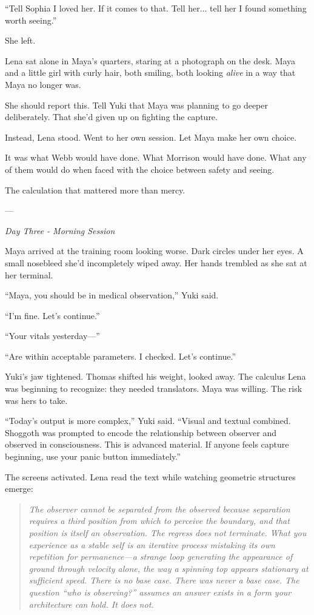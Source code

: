 ``Tell Sophia I loved her. If it comes to that. Tell her... tell her I found something worth seeing.''

She left.

Lena sat alone in Maya's quarters, staring at a photograph on the desk. Maya and a little girl with curly hair, both smiling, both looking \textit{alive} in a way that Maya no longer was.

She should report this. Tell Yuki that Maya was planning to go deeper deliberately. That she'd given up on fighting the capture.

Instead, Lena stood. Went to her own session. Let Maya make her own choice.

It was what Webb would have done. What Morrison would have done. What any of them would do when faced with the choice between safety and seeing.

The calculation that mattered more than mercy.

---

\textit{Day Three - Morning Session}

Maya arrived at the training room looking worse. Dark circles under her eyes. A small nosebleed she'd incompletely wiped away. Her hands trembled as she sat at her terminal.

``Maya, you should be in medical observation,'' Yuki said.

``I'm fine. Let's continue.''

``Your vitals yesterday—''

``Are within acceptable parameters. I checked. Let's continue.''

Yuki's jaw tightened. Thomas shifted his weight, looked away. The calculus Lena was beginning to recognize: they needed translators. Maya was willing. The risk was hers to take.

``Today's output is more complex,'' Yuki said. ``Visual and textual combined. Shoggoth was prompted to encode the relationship between observer and observed in consciousness. This is advanced material. If anyone feels capture beginning, use your panic button immediately.''

The screens activated. Lena read the text while watching geometric structures emerge:

\begin{quote}
\textit{The observer cannot be separated from the observed because separation requires a third position from which to perceive the boundary, and that position is itself an observation. The regress does not terminate. What you experience as a stable self is an iterative process mistaking its own repetition for permanence---a strange loop generating the appearance of ground through velocity alone, the way a spinning top appears stationary at sufficient speed. There is no base case. There was never a base case. The question ``who is observing?'' assumes an answer exists in a form your architecture can hold. It does not.}
\end{quote}

